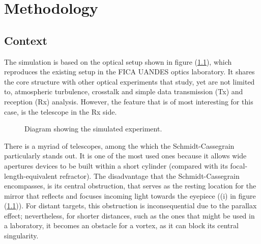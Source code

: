 \chapter{Methodology} \label{Procedure}
\label{c3} %

\section{Context}
\label{c3:Methodology:Context}
The simulation is based on the optical setup shown in figure (\ref{fig:Simulated_Experiment}), which reproduces the existing setup in the FICA UANDES optics laboratory. It shares the core structure with other optical experiments that study, yet are not limited to, atmospheric turbulence, crosstalk and simple data transmission (Tx) and reception (Rx) analysis. However, the feature that is of most interesting for this case, is the telescope in the Rx side.

\begin{figure}[htbp]
    \centering
    \caption{Diagram showing the simulated experiment.}
    \label{fig:Simulated_Experiment}
\end{figure}

\newpage
There is a myriad of telescopes, among the which the Schmidt-Cassegrain particularly stands out. It is one of the most used ones because it allows wide apertures devices to be built within a short cylinder (compared with its focal-length-equivalent refractor). The disadvantage that the Schmidt-Cassegrain encompasses, is its central obstruction, that serves as the resting location for the mirror that reflects and focuses incoming light towards the eyepiece ((i) in figure (\ref{fig:Simulated_Experiment})). For distant targets, this obstruction is inconsequential due to the parallax effect; nevertheless, for shorter distances, such as the ones that might be used in a laboratory, it becomes an obstacle for a vortex, as it can block its central singularity.

